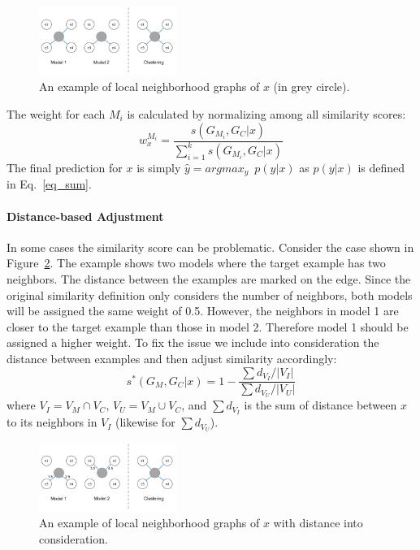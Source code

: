 \begin{figure}[h]
\centering
    \includegraphics[width=0.4\textwidth]{./fig/lwe_graph}
\caption{An example of local neighborhood graphs of $x$ (in grey circle).}
\label{fig:graph}
\end{figure}

The weight for each $M_i$ is calculated by normalizing among all similarity scores:
\begin{equation}\label{eq_norm}
w_{x}^{M_i} = \frac {s(G_{M_i}, G_C|x)} {\sum_{i=1}^k s(G_{M_i}, G_C|x)}
\end{equation}
The final prediction for $x$ is simply $\hat y = argmax_y \enspace p(y|x)$ as $p(y|x)$ is defined in Eq.~\ref{eq_sum}.

\paragraph{Distance-based Adjustment}
In some cases the similarity score can be problematic. Consider the case shown in Figure~\ref{graph_dist}.
The example shows two models where the target example has two neighbors.  The distance between the examples are marked on the edge.
Since the original similarity definition only considers the number of neighbors, both models will be assigned the same weight of 0.5.
However, the neighbors in model 1 are closer to the target example than those in model 2.  Therefore model 1 should be assigned a higher
weight.
To fix the issue we include into consideration the distance between examples and then adjust similarity accordingly:
\begin{equation}\label{d_sim}
s^\ast(G_M, G_C|x) = 1 - \frac {\sum d_{V_I}/|V_I|} {\sum d_{V_U}/|V_U|}
\end{equation}
where $V_I = V_M \cap V_C$, $V_U = V_M \cup V_C$, and $\sum d_{V_I}$ is the sum of distance between $x$ to its neighbors in $V_I$ (likewise for $\sum d_{V_U}$).

\begin{figure}[h]
\centering
    \includegraphics[width=0.4\textwidth]{./fig/lwe_d_graph}
\caption{An example of local neighborhood graphs of $x$ with distance into consideration.}
\label{graph_dist}
\end{figure}

